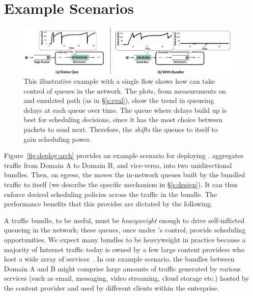 \section{Example Scenarios}\label{s:deploy}
\begin{figure}[t]
    \centering
    \includegraphics[width=\textwidth]{img/shift-bottleneck-combined}
    \caption{This illustrative example with a single flow shows how \name can take control of queues in the network. The plots, from measurements on and emulated path (as in \S\ref{s:eval}), show the trend in queueing delays at each queue over time. The queue where delays build up is best for scheduling decisions, since it has the most choice between packets to send next. Therefore, the \inbox \emph{shifts} the queues to itself to gain scheduling power.}\label{fig:design:shift-bottleneck}
\end{figure}
%


Figure~\ref{fig:deploy:arch} provides an example scenario for deploying \name. 
\name aggregates traffic from Domain A to Domain B, and vice-versa, into two unidirectional bundles. 
Then, on egress, the \inbox moves the in-network queues built by the bundled traffic to itself (we describe the specific mechanism in \S\ref{s:design}). 
It can thus enforce desired scheduling policies across the traffic in the bundle.
The performance benefits that this provides are dictated by the following.

A traffic bundle, to be useful, must be \emph{heavyweight} enough to drive self-inflicted queueing in the network; these queues, once under \name's control, provide scheduling opportunities. We expect many bundles to be heavyweight in practice because a majority of Internet traffic today is owned by a few large content providers who host a wide array of services~\cite{fivecomps, labovitz}. 
In our example scenario, the bundles between Domain A and B might comprise large amounts of traffic generated by various services (such as email, messaging, video streaming, cloud storage etc.) hosted by the content provider and used by different clients within the enterprise. 

